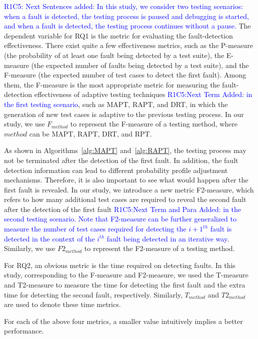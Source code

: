 \documentclass[10pt,journal,compsoc]{IEEEtran}
\begin{document}
\textcolor{blue}{R1C5: Next Sentences added: In this study, we consider two testing scenarios: when a fault is detected, the testing process is paused and debugging is started, and when a fault is detected, the testing process continues without a pause.}
The dependent variable for RQ1 is the metric for evaluating the fault-detection effectiveness. There exist quite a few effectiveness metrics, such as the P-measure (the probability of at least one fault being detected by a test suite), the E-measure (the expected number of faults being detected by a test suite), and the F-measure (the expected number of test cases to detect the first fault). Among them, the F-measure is the most appropriate metric for measuring the fault-detection effectiveness of adaptive testing techniques \textcolor{blue}{R1C5:Next Term Added: in the first testing scenario}, such as MAPT, RAPT, and DRT, in which the generation of new test cases is adaptive to the previous testing process. In our study, we use $F_{method}$ to represent the F-measure of a testing method, where $method$ can be MAPT, RAPT, DRT, and RPT.

As shown in Algorithms~\ref{alg:MAPT} and~\ref{alg:RAPT}, the testing process may not be terminated after the detection of the first fault. In addition, the fault detection information can lead to different probability profile adjustment mechanisms. Therefore, it is also important to see what would happen after the first fault is revealed. In our study, we introduce a new metric F2-measure, which refers to how many additional test cases are required to reveal the second fault after the detection of the first fault \textcolor{blue}{R1C5:Next Term and Para Added: in the second testing scenario. Note that F2-measure can be further generalized to measure the number of test cases required for detecting the ${i+1}^{th}$ fault is detected in the context of the $i^{th}$ fault being detected in an iterative way}. Similarly, we use $F2_{method}$ to represent the F2-measure of a testing method.

For RQ2, an obvious metric is the time required on detecting faults. In this study, corresponding to the F-measure and F2-measure, we used the T-measure and T2-measure to measure the time for detecting the first fault and the extra time for detecting the second fault, respectively. Similarly, $T_{method}$ and $T2_{method}$ are used to denote these time metrics.

For each of the above four metrics, a smaller value intuitively implies a better performance.
\end{document}
